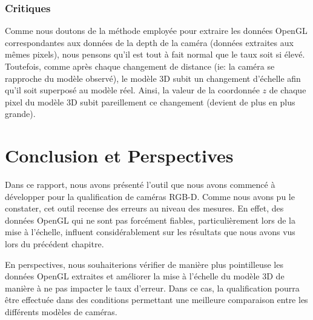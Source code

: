 \documentclass[a4paper, 12pt]{book}
\begin{document}
\subsection{Critiques}
Comme nous doutons de la méthode employée pour extraire les données OpenGL correspondantes aux données de la depth de la caméra (données extraites aux mêmes pixels), nous pensons qu'il est tout à fait normal que le taux soit si élevé. Toutefois, comme après chaque changement de distance (ie: la caméra se rapproche du modèle observé), le modèle 3D subit un changement d'échelle afin qu'il soit superposé au modèle réel. Ainsi, la valeur de la coordonnée $z$ de chaque pixel du modèle 3D subit pareillement ce changement (devient de plus en plus grande).



\chapter{Conclusion et Perspectives\label{chap-conclusion}}
\par Dans ce rapport, nous avons présenté l'outil que nous avons commencé à développer pour la qualification de caméras RGB-D. Comme nous avons pu le constater, cet outil recense des erreurs au niveau des mesures. En effet, des données OpenGL qui ne sont pas forcément fiables, particulièrement lors de la mise à l'échelle, influent considérablement sur les résultats que nous avons vus lors du précédent chapitre.
\par En perspectives, nous souhaiterions vérifier de manière plus pointilleuse les données OpenGL extraites et améliorer la mise à l'échelle du modèle 3D de manière à ne pas impacter le taux d'erreur.
Dans ce cas, la qualification pourra être effectuée dans des conditions permettant une meilleure comparaison entre les différents modèles de caméras.  

\nocite{*}
%	
%
\printbibliography
\end{document}
